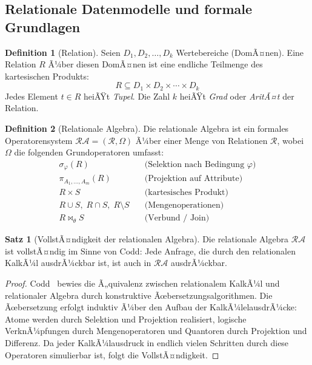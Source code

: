 ﻿\documentclass[a4paper,12pt]{article}
\theoremstyle{definition}
\newtheorem{definition}{Definition}
\newtheorem{satz}{Satz}
\begin{document}
\subsection{Relationale Datenmodelle und formale Grundlagen}

\begin{definition}[Relation]
\label{def:relation}
Seien $D_1, D_2, \ldots, D_k$ Wertebereiche (DomÃ¤nen). Eine Relation $R$ Ã¼ber diesen DomÃ¤nen ist eine endliche Teilmenge des kartesischen Produkts:
\[
R \subseteq D_1 \times D_2 \times \cdots \times D_k
\]
Jedes Element $t \in R$ heiÃŸt \emph{Tupel}. Die Zahl $k$ heiÃŸt \emph{Grad} oder \emph{AritÃ¤t} der Relation.
\end{definition}

\begin{definition}[Relationale Algebra]
\label{def:algebra}
Die relationale Algebra ist ein formales Operatorensystem $\mathcal{RA} = (\mathcal{R}, \Omega)$ Ã¼ber einer Menge von Relationen $\mathcal{R}$, wobei $\Omega$ die folgenden Grundoperatoren umfasst:
\begin{align*}
\sigma_\varphi(R) &\quad \text{(Selektion nach Bedingung $\varphi$)} \\
\pi_{A_1,\ldots,A_m}(R) &\quad \text{(Projektion auf Attribute)} \\
R \times S &\quad \text{(kartesisches Produkt)} \\
R \cup S, \; R \cap S, \; R \setminus S &\quad \text{(Mengenoperationen)} \\
R \bowtie_\theta S &\quad \text{(Verbund / Join)}
\end{align*}
\end{definition}

\begin{satz}[VollstÃ¤ndigkeit der relationalen Algebra]
\label{satz:vollstaendigkeit}
Die relationale Algebra $\mathcal{RA}$ ist vollstÃ¤ndig im Sinne von Codd: Jede Anfrage, die durch den relationalen KalkÃ¼l ausdrÃ¼ckbar ist, ist auch in $\mathcal{RA}$ ausdrÃ¼ckbar.
\end{satz}

\begin{proof}
Codd~\cite{codd1970} bewies die Ã„quivalenz zwischen relationalem KalkÃ¼l und relationaler Algebra durch konstruktive Ãœbersetzungsalgorithmen. Die Ãœbersetzung erfolgt induktiv Ã¼ber den Aufbau der KalkÃ¼lelausdrÃ¼cke: Atome werden durch Selektion und Projektion realisiert, logische VerknÃ¼pfungen durch Mengenoperatoren und Quantoren durch Projektion und Differenz. Da jeder KalkÃ¼lausdruck in endlich vielen Schritten durch diese Operatoren simulierbar ist, folgt die VollstÃ¤ndigkeit.
\end{proof}
\end{document}
